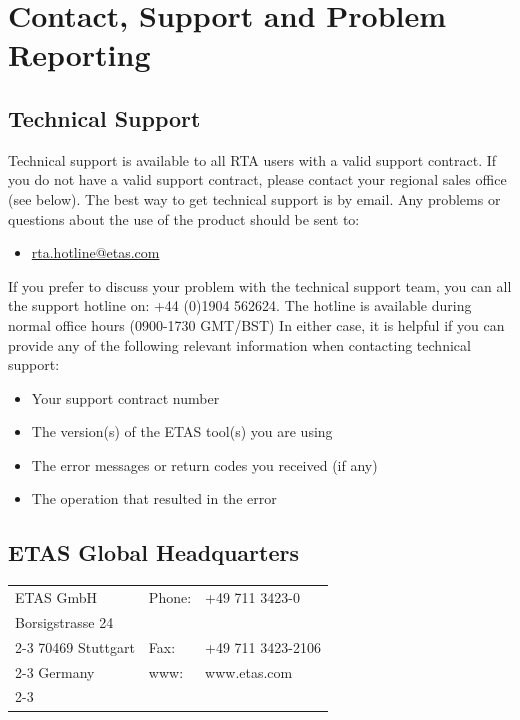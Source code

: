 \chapter{Contact, Support and Problem Reporting}
\section{Technical Support}
Technical support is available to all RTA users with a valid support contract. If you do not have a valid support contract, please contact your regional sales office (see below).
\vfill
The best way to get technical support is by email. Any problems or questions about the use of the product should be sent to: 
\begin{itemize}
	\item \href{rta.hotline@etas.com}{rta.hotline@etas.com}	
\end{itemize}    

If you prefer to discuss your problem with the technical support team, you can all the support hotline on: 
\vfill
 +44 (0)1904 562624. 
\vfill
The hotline is available during normal office hours (0900-1730 GMT/BST)
\vfill
In either case, it is helpful if you can provide any of the following relevant information when contacting technical support:
\begin{itemize}
	\item Your support contract number
	\item The version(s) of the ETAS tool(s) you are using
	\item The error messages or return codes you received (if any)
	\item The operation that resulted in the error
\end{itemize}

\section{ETAS Global Headquarters}

\begin{tabular}{| p{4.5cm} | p{5cm} | p{5cm} |}
	\hline
	ETAS GmbH & Phone: & +49 711 3423-0 \\
	Borsigstrasse 24 & & \\ \cline{2-3}
	70469 Stuttgart & Fax: & +49 711 3423-2106 \\ \cline{2-3}
	Germany & www: & www.etas.com \\ \cline{2-3}
	\hline 
\end{tabular}

